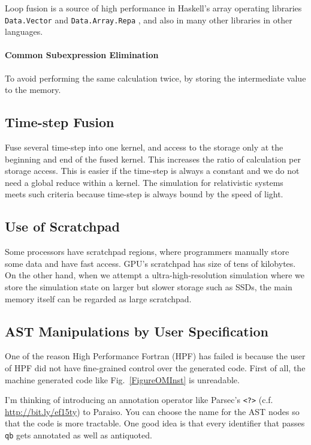 \documentclass[twocolumn]{article}
\begin{document}
Loop fusion is a source of high performance in Haskell's array operating
libraries {\tt Data.Vector} and {\tt Data.Array.Repa}
\cite{Keller:2010:RSP:1932681.1863582}, and also in many other libraries in
other languages.


\paragraph{Common Subexpression Elimination}

To avoid performing the same calculation twice, by storing the intermediate
value to the memory. 

\subsection{Time-step Fusion}

Fuse several time-step into one kernel, and access to the storage only at the
beginning and end of the fused kernel. This increases the ratio of
calculation per storage access. This is easier if the time-step is always a
constant and we do not need a global reduce within a kernel. The simulation
for relativistic systems meets such criteria because time-step is always bound
by the speed of light.

\subsection{Use of Scratchpad}

Some processors have scratchpad regions, where programmers manually store some
data and have fast access. GPU's scratchpad has size of tens of kilobytes. On
the other hand, when we attempt a ultra-high-resolution simulation where we
store the simulation state on larger but slower storage such as SSDs, the main
memory itself can be regarded as large scratchpad. 


\subsection{AST Manipulations by User Specification}
One of the reason High Performance Fortran (HPF) has failed
\cite{Kennedy:2007:RFH:1238844.1238851} is because the user of HPF did not
have fine-grained control over the generated code.  First of all, the machine
generated code like Fig.~\ref{FigureOMInst} is unreadable.

I'm thinking of introducing an annotation operator like Parsec's {\tt <?>}
(c.f. \url{http://bit.ly/ef15ty}) to Paraiso. You can choose the name for the
AST nodes so that the code is more tractable. One good idea is that every
identifier that passes {\tt qb} gets annotated as well as antiquoted.
\end{document}
